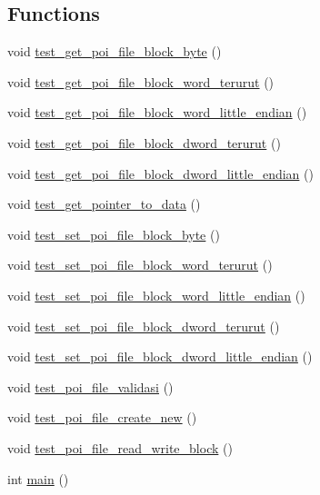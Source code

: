 \subsection*{Functions}
\begin{DoxyCompactItemize}
\item 
void \hyperlink{file-manager-test_8c_a5ac73022b92d1b11a8c7dd258e6a3c05}{test\-\_\-get\-\_\-poi\-\_\-file\-\_\-block\-\_\-byte} ()
\item 
void \hyperlink{file-manager-test_8c_ac83be9062708a320b213ea777b9936a2}{test\-\_\-get\-\_\-poi\-\_\-file\-\_\-block\-\_\-word\-\_\-terurut} ()
\item 
void \hyperlink{file-manager-test_8c_ab2796fc355518ea87a4543c95445efef}{test\-\_\-get\-\_\-poi\-\_\-file\-\_\-block\-\_\-word\-\_\-little\-\_\-endian} ()
\item 
void \hyperlink{file-manager-test_8c_a982b7f75dae7f0c64de90c336dc81e98}{test\-\_\-get\-\_\-poi\-\_\-file\-\_\-block\-\_\-dword\-\_\-terurut} ()
\item 
void \hyperlink{file-manager-test_8c_a14efb3c545560094cdba22615de84fa6}{test\-\_\-get\-\_\-poi\-\_\-file\-\_\-block\-\_\-dword\-\_\-little\-\_\-endian} ()
\item 
void \hyperlink{file-manager-test_8c_a3276ab307488f7d5d95914c1395d6dc8}{test\-\_\-get\-\_\-pointer\-\_\-to\-\_\-data} ()
\item 
void \hyperlink{file-manager-test_8c_a7ce915d534c2142afec851ce211736e9}{test\-\_\-set\-\_\-poi\-\_\-file\-\_\-block\-\_\-byte} ()
\item 
void \hyperlink{file-manager-test_8c_ae28da6065fa9458daae91f1e5a1b82f8}{test\-\_\-set\-\_\-poi\-\_\-file\-\_\-block\-\_\-word\-\_\-terurut} ()
\item 
void \hyperlink{file-manager-test_8c_ace8433f512d67f05bd72e87edff7bd2f}{test\-\_\-set\-\_\-poi\-\_\-file\-\_\-block\-\_\-word\-\_\-little\-\_\-endian} ()
\item 
void \hyperlink{file-manager-test_8c_a6ae0cb496015b2a05c9cf3dc5a26705a}{test\-\_\-set\-\_\-poi\-\_\-file\-\_\-block\-\_\-dword\-\_\-terurut} ()
\item 
void \hyperlink{file-manager-test_8c_a8d5dcc4b44c52164b17db995438894ca}{test\-\_\-set\-\_\-poi\-\_\-file\-\_\-block\-\_\-dword\-\_\-little\-\_\-endian} ()
\item 
void \hyperlink{file-manager-test_8c_a9a65ce90a5f89301cfabe93522750d72}{test\-\_\-poi\-\_\-file\-\_\-validasi} ()
\item 
void \hyperlink{file-manager-test_8c_a48a3a16433027e57b2849906439b9c5b}{test\-\_\-poi\-\_\-file\-\_\-create\-\_\-new} ()
\item 
void \hyperlink{file-manager-test_8c_a15832d194153478fa3939dc1e3d83add}{test\-\_\-poi\-\_\-file\-\_\-read\-\_\-write\-\_\-block} ()
\item 
int \hyperlink{file-manager-test_8c_ae66f6b31b5ad750f1fe042a706a4e3d4}{main} ()
\end{DoxyCompactItemize}


